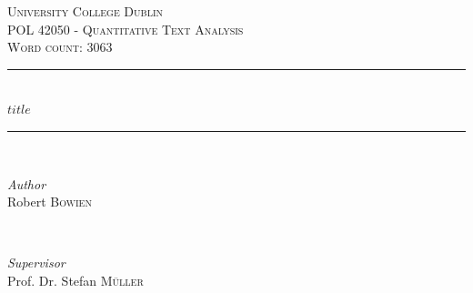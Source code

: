 %
%
%
% 


	\newcommand{\HRule}{\rule{\linewidth}{0.5mm}} %
	
	\center %
	
	
	\textsc{\LARGE University College Dublin}\\[1.5cm] %
	
	\textsc{\Large POL 42050 - Quantitative Text Analysis}\\[0.5cm] %
	
	\textsc{\large Word count: 3063}\\[0.5cm] %
	
	
	\HRule\\[0.4cm]
	
	{\huge\bfseries $title$}\\[0.4cm] %
	
	\HRule\\[1.5cm]
	
	
	\begin{minipage}{0.4\textwidth}
		\begin{flushleft}
			\large
			\textit{Author}\\
			Robert \textsc{Bowien} %
		\end{flushleft}
	\end{minipage}
	~
	\begin{minipage}{0.4\textwidth}
		\begin{flushright}
			\large
			\textit{Supervisor}\\
			Prof. Dr. Stefan \textsc{Müller} %
		\end{flushright}
	\end{minipage}
	
